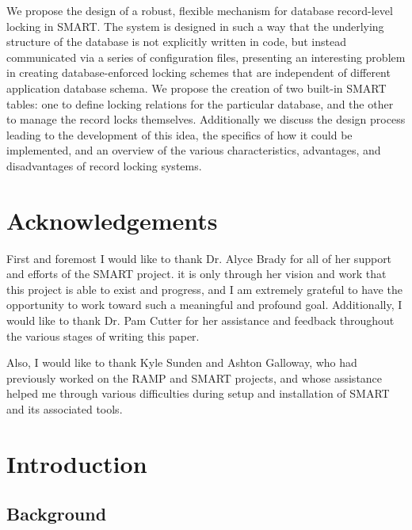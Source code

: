 \documentclass[12pt]{article}
\begin{document}
We propose the design of a robust, flexible mechanism for database record-level locking in SMART. The system is designed in such a way that the underlying structure of the database is not explicitly written in code, but instead communicated via a series of configuration files, presenting an interesting problem in creating database-enforced locking schemes that are independent of different application database schema. We propose the creation of two built-in SMART tables: one to define locking relations for the particular database, and the other to manage the record locks themselves. Additionally we discuss the design process leading to the development of this idea, the specifics of how it could be implemented, and an overview of the various characteristics, advantages, and disadvantages of record locking systems.

\newpage

\section*{Acknowledgements}
First and foremost I would like to thank Dr. Alyce Brady for all of her support and efforts of the SMART project. it is only through her vision and work that this project is able to exist and progress, and I am extremely grateful to have the opportunity to work toward such a meaningful and profound goal. Additionally, I would like to thank Dr. Pam Cutter for her assistance and feedback throughout the various stages of writing this paper.

Also, I would like to thank Kyle Sunden and Ashton Galloway, who had previously worked on the RAMP and SMART projects, and whose assistance helped me through various difficulties during setup and installation of SMART and its associated tools.

\newpage

\tableofcontents

\newpage
{}
\section{Introduction}

\subsection{Background}
\end{document}

